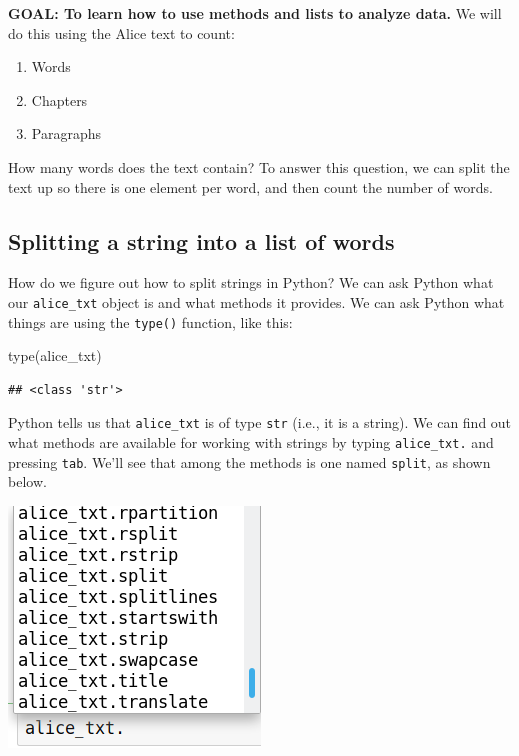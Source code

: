 \documentclass[
]{book}
\newenvironment{Shaded}{\begin{snugshade}}{\end{snugshade}}
\newcommand{\BuiltInTok}[1]{#1}
\newcommand{\NormalTok}[1]{#1}
\providecommand{\tightlist}{%
  \setlength{\itemsep}{0pt}\setlength{\parskip}{0pt}}
\begin{document}
\begin{alert}

\textbf{GOAL: To learn how to use methods and lists to analyze data.} We will do this using the Alice text to count:

\begin{enumerate}
\def\labelenumi{\arabic{enumi}.}
\tightlist
\item
  Words
\item
  Chapters
\item
  Paragraphs
\end{enumerate}

\end{alert}

How many words does the text contain? To answer this question, we can split the text up so there is one element per word, and then count the number of words.

\hypertarget{splitting-a-string-into-a-list-of-words}{%
\subsection{Splitting a string into a list of words}\label{splitting-a-string-into-a-list-of-words}}

How do we figure out how to split strings in Python? We can ask Python what our \texttt{alice\_txt} object is and what methods it provides. We can ask Python what things are using the \texttt{type()} function, like this:

\begin{Shaded}
\begin{Highlighting}[]
\BuiltInTok{type}\NormalTok{(alice\_txt)}
\end{Highlighting}
\end{Shaded}

\begin{verbatim}
## <class 'str'>
\end{verbatim}

Python tells us that \texttt{alice\_txt} is of type \texttt{str} (i.e., it is a string). We can find out what methods are available for working with strings by typing \texttt{alice\_txt.} and pressing \texttt{tab}. We'll see that among the methods is one named \texttt{split}, as shown below.

\includegraphics{Python/PythonIntro/images/notebook_string_completion.png}
\end{document}
